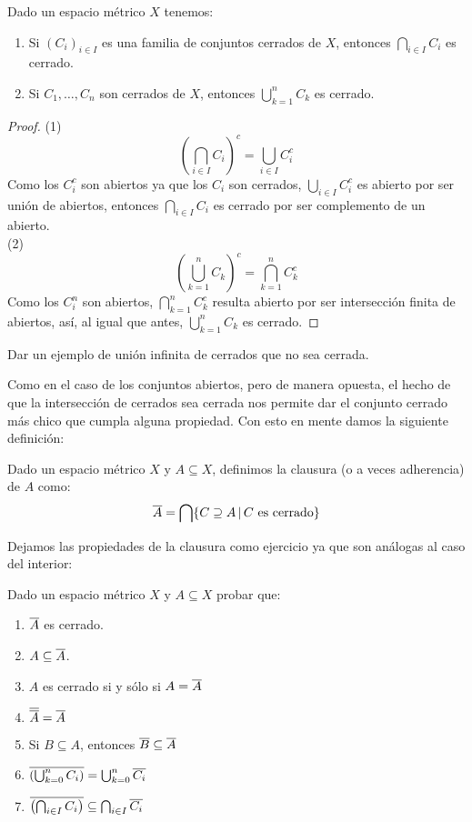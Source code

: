 \documentclass[12pt,a4paper]{book}
\begin{document}
\begin{prop}
Dado un espacio métrico $X$ tenemos:
\begin{enumerate}
\item Si $(C_i)_{i \in I}$ es una familia de conjuntos cerrados de $X$, entonces $\bigcap_{i \in I} C_i$ es cerrado.
\item Si $C_1, \ldots, C_n$ son cerrados de $X$, entonces $\bigcup_{k = 1}^n C_k$ es cerrado.
\end{enumerate}
\begin{proof}
(1) $$ \left(\bigcap_{i \in I} C_i\right)^c = \bigcup_{i \in I} C_i^c$$
Como los $C_i^c$ son abiertos ya que los $C_i$ son cerrados, $\bigcup_{i \in I} C_i^c$ es abierto por ser unión de abiertos, entonces $\bigcap_{i \in I} C_i$ es cerrado por ser complemento de un abierto.\\
(2) $$\left(\bigcup_{k = 1}^n C_k\right)^c = \bigcap_{k = 1}^n C_k^c$$
Como los $C_i^n$ son abiertos, $\bigcap_{k = 1}^n C_k^c$ resulta abierto por ser intersección finita de abiertos, así, al igual que antes, $\bigcup_{k = 1}^n C_k$ es cerrado.
\end{proof}
\end{prop}
\begin{ej} Dar un ejemplo de unión infinita de cerrados que no sea cerrada.\end{ej}
Como en el caso de los conjuntos abiertos, pero de manera opuesta, el hecho de que la intersección de cerrados sea cerrada nos permite dar el conjunto cerrado más chico que cumpla alguna propiedad. Con esto en mente damos la siguiente definición:
\begin{defi} Dado un espacio métrico $X$ y $A \subseteq X$, definimos la clausura (o a veces adherencia) de $A$ como:
$$ \overline{A} = \bigcap \{ C \supseteq A \,\vert\, C \mbox{ es cerrado}\}$$
\end{defi}
Dejamos las propiedades de la clausura como ejercicio ya que son análogas al caso del interior:
\begin{ej} Dado un espacio métrico $X$ y $A \subseteq X$ probar que:
\begin{enumerate}
\item $\overline{A}$ es cerrado.
\item $A \subseteq \overline{A}$.
\item $A$ es cerrado si y sólo si $A = \overline{A}$
\item $\overline{\overline{A}} = \overline{A}$
\item Si $B \subseteq A$, entonces $\overline{B} \subseteq \overline{A}$
\item $\overline{ \left(\bigcup_{k = 0}^n C_i  \right)} = \bigcup_{k = 0}^n \overline{C_i}$
\item $\overline{\left(\bigcap_{{i} \in I} C_i\right)} \subseteq \bigcap_{{i} \in I} \overline{C_i}$
\end{enumerate}
\end{ej}
\end{document}
